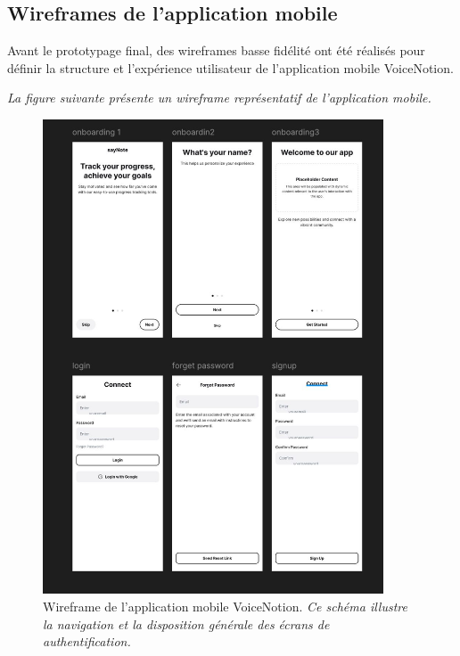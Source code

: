     
    
    \subsection{Wireframes de l'application mobile}
    
    Avant le prototypage final, des wireframes basse fidélité ont été réalisés pour définir la structure et l'expérience utilisateur de l'application mobile VoiceNotion.
    
        \textit{La figure suivante présente un wireframe représentatif de l'application mobile.}
    \begin{figure}[H]
        \centering
        \includegraphics[width=0.9\textwidth]{assets/docs/mobile/wireframe_app-1.jpg}
        \caption{Wireframe de l'application mobile VoiceNotion. \newline\textit{Ce schéma illustre la navigation et la disposition générale des écrans de authentification.}}
        \label{fig:wireframe_app_auth}
    \end{figure}
    
